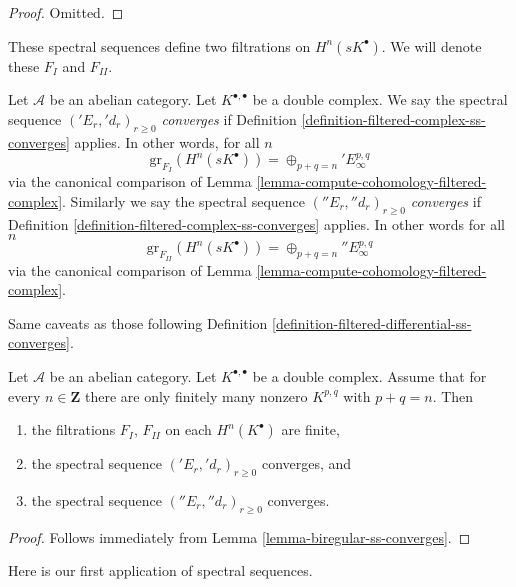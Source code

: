 \begin{proof}
Omitted.
\end{proof}

\noindent
These spectral sequences define two filtrations on $H^n(sK^\bullet)$.
We will denote these $F_I$ and $F_{II}$.

\begin{definition}
\label{definition-ss-double-complex-converge}
Let $\mathcal{A}$ be an abelian category.
Let $K^{\bullet, \bullet}$ be a double complex.
We say the spectral sequence $({}'E_r, {}'d_r)_{r \geq 0}$
{\it converges} if Definition \ref{definition-filtered-complex-ss-converges}
applies. In other words, for all $n$
$$
\text{gr}_{F_I}(H^n(sK^\bullet)) = \oplus_{p + q = n} {}'E_\infty^{p, q}
$$
via the canonical comparison of
Lemma \ref{lemma-compute-cohomology-filtered-complex}.
Similarly we say the spectral sequence $({}''E_r, {}''d_r)_{r \geq 0}$
{\it converges} if Definition \ref{definition-filtered-complex-ss-converges}
applies. In other words for all $n$
$$
\text{gr}_{F_{II}}(H^n(sK^\bullet)) = \oplus_{p + q = n} {}''E_\infty^{p, q}
$$
via the canonical comparison of
Lemma \ref{lemma-compute-cohomology-filtered-complex}.
\end{definition}

\noindent
Same caveats as those following
Definition \ref{definition-filtered-differential-ss-converges}.

\begin{lemma}
\label{lemma-first-quadrant-ss}
Let $\mathcal{A}$ be an abelian category.
Let $K^{\bullet, \bullet}$ be a double complex.
Assume that for every $n \in \mathbf{Z}$ there are only finitely many nonzero
$K^{p, q}$ with $p + q = n$.
Then
\begin{enumerate}
\item the filtrations $F_I$, $F_{II}$ on each $H^n(K^\bullet)$ are finite,
\item the spectral sequence $({}'E_r, {}'d_r)_{r \geq 0}$ converges, and
\item the spectral sequence $({}''E_r, {}''d_r)_{r \geq 0}$ converges.
\end{enumerate}
\end{lemma}

\begin{proof}
Follows immediately from Lemma \ref{lemma-biregular-ss-converges}.
\end{proof}

\noindent
Here is our first application of spectral sequences.

